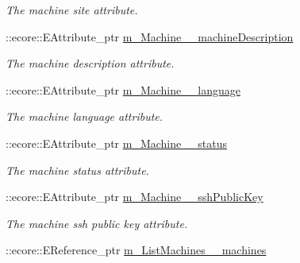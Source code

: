 \begin{DoxyCompactItemize}
\begin{DoxyCompactList}\small\item\em The machine site attribute. \item\end{DoxyCompactList}\item 
\hypertarget{classUMS__Data_1_1UMS__DataPackage_a80c576ceb4f36a8957e3a5f78830fd29}{
::ecore::EAttribute\_\-ptr \hyperlink{classUMS__Data_1_1UMS__DataPackage_a80c576ceb4f36a8957e3a5f78830fd29}{m\_\-Machine\_\-\_\-machineDescription}}
\label{classUMS__Data_1_1UMS__DataPackage_a80c576ceb4f36a8957e3a5f78830fd29}

\begin{DoxyCompactList}\small\item\em The machine description attribute. \item\end{DoxyCompactList}\item 
\hypertarget{classUMS__Data_1_1UMS__DataPackage_a1c6ea71cf97cc21a6871183326710d95}{
::ecore::EAttribute\_\-ptr \hyperlink{classUMS__Data_1_1UMS__DataPackage_a1c6ea71cf97cc21a6871183326710d95}{m\_\-Machine\_\-\_\-language}}
\label{classUMS__Data_1_1UMS__DataPackage_a1c6ea71cf97cc21a6871183326710d95}

\begin{DoxyCompactList}\small\item\em The machine language attribute. \item\end{DoxyCompactList}\item 
\hypertarget{classUMS__Data_1_1UMS__DataPackage_a7a8cb4fcf84cc12bc4bbf138bc8f904e}{
::ecore::EAttribute\_\-ptr \hyperlink{classUMS__Data_1_1UMS__DataPackage_a7a8cb4fcf84cc12bc4bbf138bc8f904e}{m\_\-Machine\_\-\_\-status}}
\label{classUMS__Data_1_1UMS__DataPackage_a7a8cb4fcf84cc12bc4bbf138bc8f904e}

\begin{DoxyCompactList}\small\item\em The machine status attribute. \item\end{DoxyCompactList}\item 
\hypertarget{classUMS__Data_1_1UMS__DataPackage_abe3b8ff0c0d2885887b8685494e384fc}{
::ecore::EAttribute\_\-ptr \hyperlink{classUMS__Data_1_1UMS__DataPackage_abe3b8ff0c0d2885887b8685494e384fc}{m\_\-Machine\_\-\_\-sshPublicKey}}
\label{classUMS__Data_1_1UMS__DataPackage_abe3b8ff0c0d2885887b8685494e384fc}

\begin{DoxyCompactList}\small\item\em The machine ssh public key attribute. \item\end{DoxyCompactList}\item 
\hypertarget{classUMS__Data_1_1UMS__DataPackage_aa1fb47b09d44a58f0c35b6a7048c3e05}{
::ecore::EReference\_\-ptr \hyperlink{classUMS__Data_1_1UMS__DataPackage_aa1fb47b09d44a58f0c35b6a7048c3e05}{m\_\-ListMachines\_\-\_\-machines}}
\label{classUMS__Data_1_1UMS__DataPackage_aa1fb47b09d44a58f0c35b6a7048c3e05}


\end{DoxyCompactItemize}
